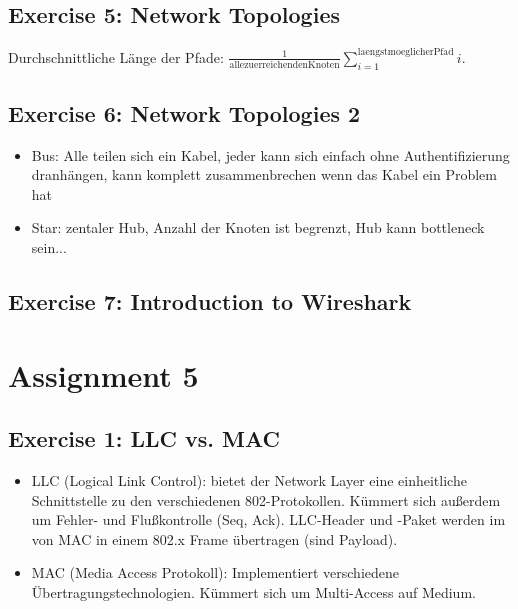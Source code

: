 \documentclass[10pt,a4paper]{scrartcl}
\begin{document}
\subsection*{Exercise 5: Network Topologies}
Durchschnittliche Länge der Pfade: $ \frac{1}{\mathrm{alle zu erreichenden Knoten}} \sum_{i=1}^{\mathrm{laengstmoeglicher Pfad}}{i} $.

\subsection*{Exercise 6: Network Topologies 2}
\begin{itemize}
\item Bus: Alle teilen sich ein Kabel, jeder kann sich einfach ohne Authentifizierung dranhängen, kann komplett zusammenbrechen wenn das Kabel ein Problem hat
\item Star: zentaler Hub, Anzahl der Knoten ist begrenzt, Hub kann bottleneck sein...
\end{itemize}

\subsection*{Exercise 7: Introduction to Wireshark}


\section*{Assignment 5}

\subsection*{Exercise 1: LLC vs. MAC}
\begin{itemize}
\item LLC (Logical Link Control): bietet der Network Layer eine einheitliche Schnittstelle zu den verschiedenen 802-Protokollen. Kümmert sich außerdem um Fehler- und Flußkontrolle (Seq, Ack). LLC-Header und -Paket werden im von MAC in einem 802.x Frame übertragen (sind Payload).
\item MAC (Media Access Protokoll): Implementiert verschiedene Übertragungstechnologien. Kümmert sich um Multi-Access auf Medium.
\end{itemize}
\end{document}
